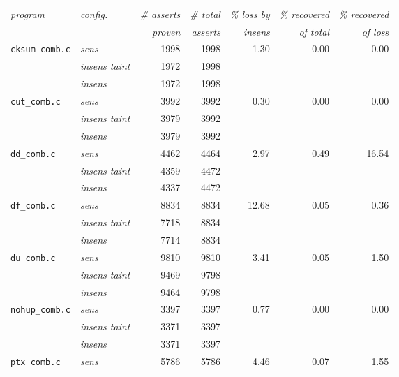       \begin{figure}[!ht]
        \centering
        \begin{tabular}{l|l||r|r||r|r|r}
          \textit{program} & \textit{config.} & \textit{\# asserts} & \textit{\# total} & \textit{\% loss by} & \textit{\% recovered} & \textit{\% recovered}\\
            &  & \textit{proven} & \textit{asserts} & \textit{insens} & \textit{of total} & \textit{of loss}\\
          \hline
          \texttt{cksum\_comb.c} & \textit{sens} & 1998 & 1998 & 1.30 & 0.00 & 0.00\\
          & \textit{insens taint} & 1972 & 1998 & & & \\
          & \textit{insens} & 1972 & 1998 & & & \\
          \hline
          \texttt{cut\_comb.c} & \textit{sens} & 3992 & 3992 & 0.30 & 0.00 & 0.00\\
          & \textit{insens taint} & 3979 & 3992 & & & \\
          & \textit{insens} & 3979 & 3992 & & & \\
          \hline
          \texttt{dd\_comb.c} & \textit{sens} & 4462 & 4464 & 2.97 & 0.49 & 16.54\\
          & \textit{insens taint} & 4359 & 4472 & & & \\
          & \textit{insens} & 4337 & 4472 & & & \\
          \hline          
          \texttt{df\_comb.c} & \textit{sens} & 8834 & 8834 & 12.68 & 0.05 & 0.36\\
          & \textit{insens taint} & 7718 & 8834 & & & \\
          & \textit{insens} & 7714 & 8834 & & & \\
          \hline         
          \texttt{du\_comb.c} & \textit{sens} & 9810 & 9810 & 3.41 & 0.05 & 1.50\\
          & \textit{insens taint} & 9469 & 9798 & & & \\
          & \textit{insens} & 9464 & 9798 & & & \\
          \hline         
          \texttt{nohup\_comb.c} & \textit{sens} & 3397 & 3397 & 0.77 & 0.00 & 0.00\\
          & \textit{insens taint} & 3371 & 3397 & & & \\
          & \textit{insens} & 3371 & 3397 & & & \\
          \hline         
          \texttt{ptx\_comb.c} & \textit{sens} & 5786 & 5786 & 4.46 & 0.07 & 1.55\\

\end{tabular}
\end{figure}
